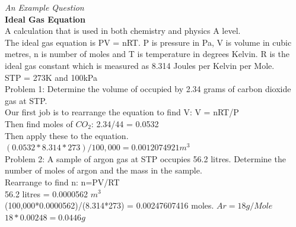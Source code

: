 \documentclass[a4paper,12pt]{report}
\begin{document}
\begin{flushleft}
         \emph{ An Example Question}\\
         \bigskip
\textbf{Ideal Gas Equation}\\  A calculation that is used in both chemistry and physics A level.\\
The ideal gas equation is PV = nRT. P is pressure in Pa, V is volume in cubic metres, n is number of moles and T is temperature in degrees Kelvin. R is the ideal gas constant which is measured as 8.314 Joules per Kelvin per Mole.\\
STP = 273K and 100kPa\\
Problem 1: Determine the volume of occupied by 2.34 grams of carbon dioxide gas at STP.\\
Our first job is to rearrange the equation to find V: V = nRT/P\\
Then find moles of ${CO}_{2}$: 2.34/44 =  0.0532\\
Then apply these to the equation.\\
$ (0.0532*8.314*273)/100,000 = 0.0012074921  m^3 $\\
Problem 2: A sample of argon gas at STP occupies 56.2 litres. Determine the number of moles of argon and the mass in the sample.\\
Rearrange to find n: n=PV/RT\\
56.2  litres = 0.0000562 $ m^3 $\\
(100,000*0.0000562)/(8.314*273) = 0.00247607416 moles. $ Ar = 18g/Mole $\\
$ 18*0.00248 = 0.0446g $\\


\end{flushleft}
\end{document}
